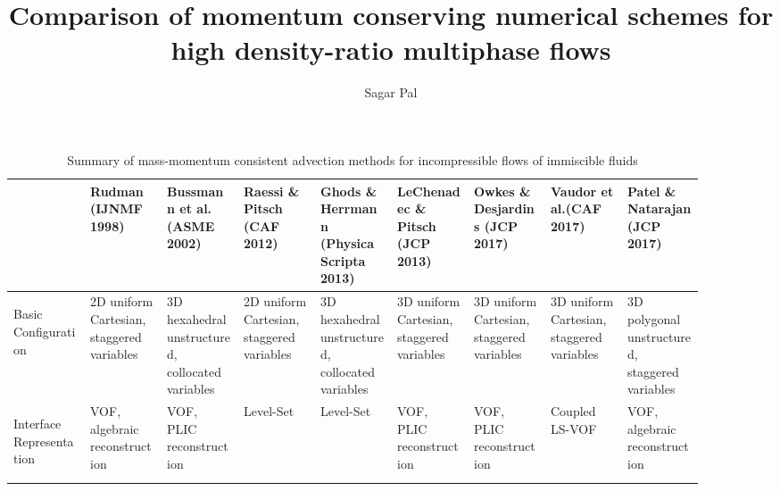 \documentclass[10pt,a4paper]{report}
\author{Sagar Pal}
\title{Comparison of momentum conserving numerical schemes for high density-ratio multiphase flows}
\begin{document}
\thispagestyle{empty}
\clearpage
  \begin{landscape}
      \begin{table}[p]
      	\renewcommand\arraystretch{1.8}
      	\centering
      	\caption{Summary of mass-momentum consistent advection methods for incompressible flows of immiscible fluids}
      	  \begin{tabular}[t]{ >{\bfseries\raggedright}m{0.1\linewidth} >{\raggedright}m{0.1\linewidth} >{\raggedright}m{0.1\linewidth}  >{\raggedright}m{0.1\linewidth}  >{\raggedright}m{0.1\linewidth}  >{\raggedright}m{0.1\linewidth}  >{\raggedright}m{0.1\linewidth} >{\raggedright}m{0.1\linewidth} >{\raggedright\arraybackslash}m{0.1\linewidth} }
      	  	\toprule
      	  	& Rudman \newline(IJNMF 1998) &  Bussmann et al. \newline (ASME 2002) & Raessi \& Pitsch \newline (CAF 2012)& Ghods \& Herrmann \newline (Physica Scripta 2013) & LeChenadec \& Pitsch \newline (JCP 2013) & Owkes \& Desjardins \newline (JCP 2017) & Vaudor et al.\newline (CAF 2017)
      	  	& Patel \& Natarajan \newline (JCP 2017) \\
      	  	\midrule
      	  	Basic Configuration & 2D uniform Cartesian, \newline staggered variables & 3D hexahedral unstructured, \newline collocated variables & 2D uniform Cartesian, \newline staggered variables & 3D hexahedral unstructured, \newline collocated variables & 3D uniform Cartesian, \newline staggered variables & 3D uniform Cartesian, \newline staggered variables & 3D uniform Cartesian, \newline staggered variables & 3D polygonal unstructured, \newline staggered variables \\ 


      	  	Interface Representation & VOF, algebraic reconstruction & VOF, PLIC reconstruction & Level-Set & Level-Set & VOF, PLIC reconstruction & VOF, PLIC reconstruction & Coupled LS-VOF & VOF, algebraic reconstruction \\



\end{tabular}
\end{table}
\end{landscape}
\end{document}
